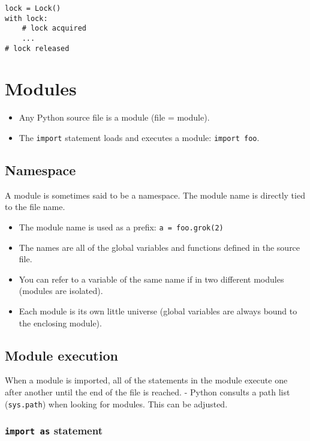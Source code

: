 \documentclass[
  letterpaper,
  DIV=11,
  numbers=noendperiod]{scrreprt}
\providecommand{\tightlist}{%
  \setlength{\itemsep}{0pt}\setlength{\parskip}{0pt}}
\begin{document}
\begin{verbatim}
lock = Lock()
with lock:
    # lock acquired
    ...
# lock released
\end{verbatim}

\hypertarget{modules}{%
\section{Modules}\label{modules}}

\begin{itemize}
\tightlist
\item
  Any Python source file is a module (file = module).
\item
  The \texttt{import} statement loads and executes a module:
  \texttt{import\ foo}.
\end{itemize}

\hypertarget{namespace}{%
\subsection{Namespace}\label{namespace}}

A module is sometimes said to be a namespace. The module name is
directly tied to the file name.

\begin{itemize}
\tightlist
\item
  The module name is used as a prefix: \texttt{a\ =\ foo.grok(2)}
\item
  The names are all of the global variables and functions defined in the
  source file.
\item
  You can refer to a variable of the same name if in two different
  modules (modules are isolated).
\item
  Each module is its own little universe (global variables are always
  bound to the enclosing module).
\end{itemize}

\hypertarget{module-execution}{%
\subsection{Module execution}\label{module-execution}}

When a module is imported, all of the statements in the module execute
one after another until the end of the file is reached. - Python
consults a path list (\texttt{sys.path}) when looking for modules. This
can be adjusted.

\hypertarget{import-as-statement}{%
\subsubsection{\texorpdfstring{\texttt{import\ as}
statement}{import as statement}}\label{import-as-statement}}
\end{document}
